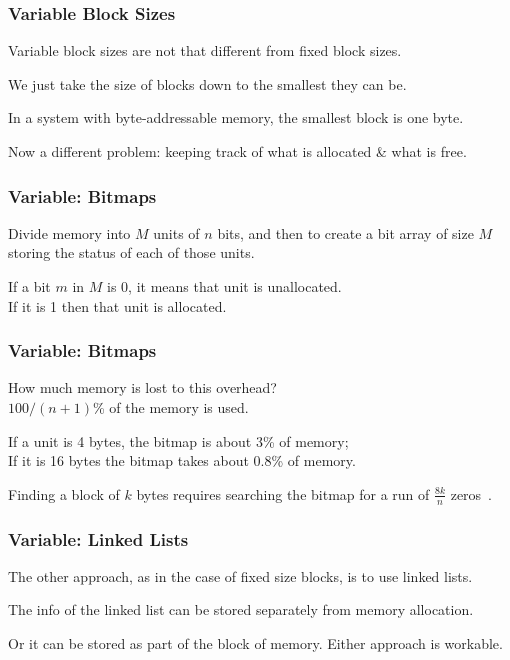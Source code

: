 \begin{frame}
\frametitle{Variable Block Sizes}

Variable block sizes are not that different from fixed block sizes.

We just take the size of blocks down to the smallest they can be. 

In a system with byte-addressable memory, the smallest block is one byte.

Now a different problem: keeping track of what is allocated \& what is free.


\end{frame}

\begin{frame}
\frametitle{Variable: Bitmaps}

Divide memory into $M$ units of $n$ bits, and then to create a bit array of size $M$ storing the status of each of those units. 

If a bit $m$ in $M$ is 0, it means that unit is unallocated.\\
If it is 1 then that unit is allocated. 

\end{frame}

\begin{frame}
\frametitle{Variable: Bitmaps}


How much memory is lost to this overhead?\\
\quad $100/(n+1)$\% of the memory is used. 

If a unit is 4 bytes, the bitmap is about 3\% of memory; \\
If it is 16 bytes the bitmap takes about 0.8\% of memory. 

Finding a block of $k$ bytes requires searching the bitmap for a run of $\frac{8k}{n}$ zeros~.

\end{frame}

\begin{frame}
\frametitle{Variable: Linked Lists}

The other approach, as in the case of fixed size blocks, is to use linked lists. 

The info of the linked list can be stored separately from memory allocation.

Or it can be stored as part of the block of memory. Either approach is workable.

\end{frame}

